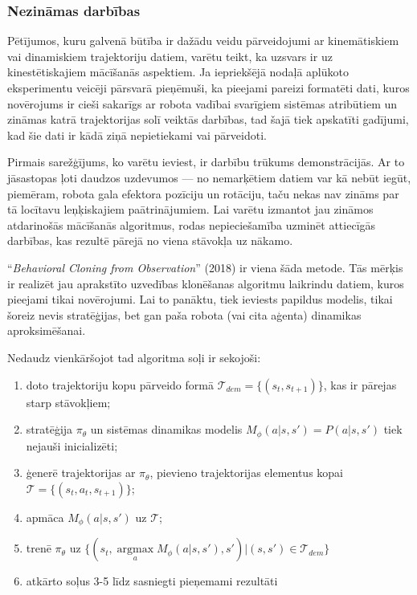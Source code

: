 \documentclass[12pt, a4paper]{article}
\numberwithin{equation}{section} %
\begin{document}
\subsubsection{Nezināmas darbības}

Pētījumos, kuru galvenā būtība ir dažādu veidu pārveidojumi ar kinemātiskiem vai dinamiskiem trajektoriju datiem, varētu teikt, ka uzsvars ir uz kinestētiskajiem mācīšanās aspektiem. Ja iepriekšējā nodaļā aplūkoto eksperimentu veicēji pārsvarā pieņēmuši, ka pieejami pareizi formatēti dati, kuros novērojums ir cieši sakarīgs ar robota vadībai svarīgiem sistēmas atribūtiem un zināmas katrā trajektorijas solī veiktās darbības, tad šajā tiek apskatīti gadījumi, kad šie dati ir kādā ziņā nepietiekami vai pārveidoti.

Pirmais sarežģījums, ko varētu ieviest, ir darbību trūkums demonstrācijās. Ar to jāsastopas ļoti daudzos uzdevumos --- no nemarķētiem datiem var kā nebūt iegūt, piemēram, robota gala efektora pozīciju un rotāciju, taču nekas nav zināms par tā locītavu leņķiskajiem paātrinājumiem. Lai varētu izmantot jau zināmos atdarinošās mācīšanās algoritmus, rodas nepieciešamība uzminēt attiecīgās darbības, kas rezultē pārejā no viena stāvokļa uz nākamo.

``\textit{Behavioral Cloning from Observation}'' \cite{torabi2018behavioral} (2018) ir viena šāda metode. Tās mērķis ir realizēt jau aprakstīto uzvedības klonēšanas algoritmu laikrindu datiem, kuros pieejami tikai novērojumi. Lai to panāktu, tiek ieviests papildus modelis, tikai šoreiz nevis stratēģijas, bet gan paša robota (vai cita aģenta) dinamikas aproksimēšanai.

Nedaudz vienkāršojot tad algoritma soļi ir sekojoši:

\begin{enumerate}
    \item doto trajektoriju kopu pārveido formā $\mathcal{T}_{dem}=\lbrace (s_t, s_{t+1}) \rbrace$, kas ir pārejas starp stāvokļiem;
    \item stratēģija $\pi_{\theta}$ un sistēmas dinamikas modelis $M_{\phi}(a \vert s,s')=P(a \vert s, s')$ tiek nejauši inicializēti;
    \item ģenerē trajektorijas ar $\pi_{\theta}$, pievieno trajektorijas elementus kopai $\mathcal{T}=\lbrace (s_t, a_t, s_{t+1}) \rbrace$;
    \item apmāca $M_{\phi}(a \vert s, s')$ uz $\mathcal{T}$;
    \item trenē $\pi_{\theta}$ uz $\lbrace (s_t, \operatorname*{argmax}\limits_a M_{\phi}(a \vert s, s'), s')\vert (s, s') \in \mathcal{T}_{dem} \rbrace$
    \item atkārto soļus 3-5 līdz sasniegti pieņemami rezultāti
\end{enumerate}
\end{document}
